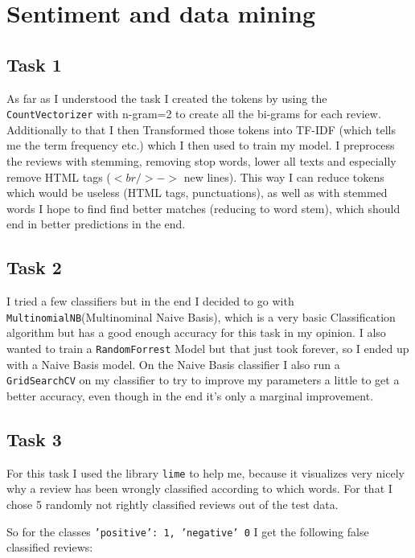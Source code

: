 \documentclass[11pt,a4paper]{article}
\begin{document}
\section{Sentiment and data mining}

\subsection{Task 1}
As far as I understood the task I created the tokens by using the \texttt{CountVectorizer} with n-gram=2 to create all the bi-grams for each review.
Additionally to that I then Transformed those tokens into TF-IDF (which tells me the term frequency etc.) which I then used to train my model.
I preprocess the reviews with stemming, removing stop words, lower all texts and especially remove HTML tags ($<br /> ->$ new lines).
This way I can reduce tokens which would be useless (HTML tags, punctuations), as well as with stemmed words I hope to find find better matches (reducing to word stem), which should end in better predictions in the end.


\subsection{Task 2}
I tried a few classifiers but in the end I decided to go with \texttt{MultinomialNB}(Multinominal Naive Basis), which is a very basic Classification algorithm but has a good enough accuracy for this task in my opinion.
I also wanted to train a \texttt{RandomForrest} Model but that just took forever, so I ended up with a Naive Basis model.
On the Naive Basis classifier I also run a \texttt{GridSearchCV} on my classifier to try to improve my parameters a little to get a better accuracy, even though in the end it's only a marginal improvement.



\subsection{Task 3}

For this task I used the library \texttt{lime} to help me, because it visualizes very nicely why a review has been wrongly classified according to which words.
For that I chose 5 randomly not rightly classified reviews out of the test data.

So for the classes \texttt{{'positive': 1, 'negative' 0}} I get the following false classified reviews:










\end{document}
